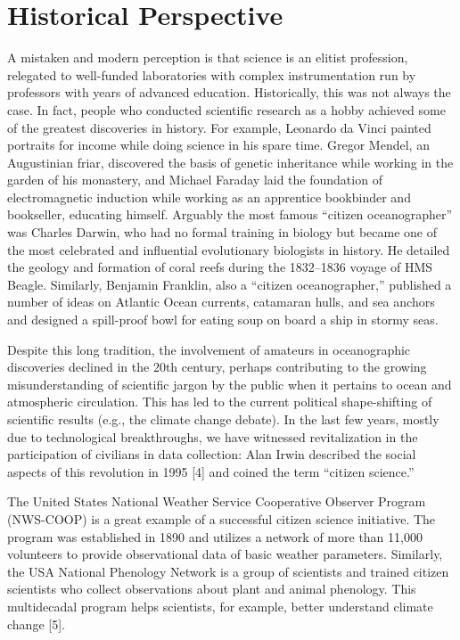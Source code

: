 \section{Historical Perspective}

A mistaken and modern perception is that science is an elitist profession, relegated to well-funded laboratories with complex instrumentation run by professors with years of advanced education. Historically, this was not always the case. In fact, people who conducted scientific research as a hobby achieved some of the greatest discoveries in history. For example, Leonardo da Vinci painted portraits for income while doing science in his spare time. Gregor Mendel, an Augustinian friar, discovered the basis of genetic inheritance while working in the garden of his monastery, and Michael Faraday laid the foundation of electromagnetic induction while working as an apprentice bookbinder and bookseller, educating himself. Arguably the most famous “citizen oceanographer” was Charles Darwin, who had no formal training in biology but became one of the most celebrated and influential evolutionary biologists in history. He detailed the geology and formation of coral reefs during the 1832–1836 voyage of HMS Beagle. Similarly, Benjamin Franklin, also a “citizen oceanographer,” published a number of ideas on Atlantic Ocean currents, catamaran hulls, and sea anchors and designed a spill-proof bowl for eating soup on board a ship in stormy seas.

Despite this long tradition, the involvement of amateurs in oceanographic discoveries declined in the 20th century, perhaps contributing to the growing misunderstanding of scientific jargon by the public when it pertains to ocean and atmospheric circulation. This has led to the current political shape-shifting of scientific results (e.g., the climate change debate). In the last few years, mostly due to technological breakthroughs, we have witnessed revitalization in the participation of civilians in data collection: Alan Irwin described the social aspects of this revolution in 1995 [4] and coined the term “citizen science.”

The United States National Weather Service Cooperative Observer Program (NWS-COOP) is a great example of a successful citizen science initiative. The program was established in 1890 and utilizes a network of more than 11,000 volunteers to provide observational data of basic weather parameters. Similarly, the USA National Phenology Network is a group of scientists and trained citizen scientists who collect observations about plant and animal phenology. This multidecadal program helps scientists, for example, better understand climate change [5].

